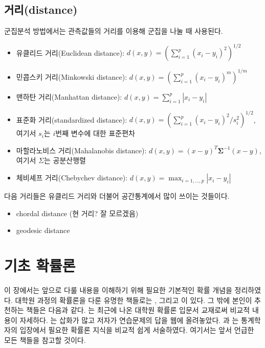 \documentclass[b5paper,]{scrbook}
\theoremstyle{plain}
\theoremstyle{definition}
\numberwithin{equation}{section}
\begin{document}
\section{거리(distance)}\label{distance}

군집분석 방법에서는 관측값들의 거리를 이용해 군집을 나눌 때 사용된다.

\begin{itemize}
\item
  유클리드 거리(Euclidean distance):
  \(d(x,y)=(\sum_{i=1}^{p}(x_{i}-y_{i})^{2})^{1/2}\)
\item
  민콥스키 거리(Minkowski distance):
  \(d(x,y)=(\sum_{i=1}^{p}(x_{i}-y_{i})^{m})^{1/m}\)
\item
  맨하탄 거리(Manhattan distance):
  \(d(x,y)=\sum_{i=1}^{p}|x_{i}-y_{i}|\)
\item
  표준화 거리(standardized distance):
  \(d(x,y)=(\sum_{i=1}^{p}(x_{i}-y_{i})^{2}/s_{i}^{2})^{1/2}\), 여기서
  \(s_{i}\)는 \(i\)번째 변수에 대한 표준편차
\item
  마할라노비스 거리(Mahalanobis distance):
  \(d(x,y)=(x-y)^{T}\boldsymbol{\Sigma}^{-1}(x-y)\), 여기서 \(\Sigma\)는
  공분산행렬
\item
  체비셰프 거리(Chebychev distance):
  \(d(x,y)=\max_{i=1,\ldots ,p}|x_{i}-y_{i}|\)
\end{itemize}

다음 거리들은 유클리드 거리와 더불어 공간통계에서 많이 쓰이는 것들이다.

\begin{itemize}
\item
  chordal distance (현 거리? 잘 모르겠음)
\item
  geodesic distance
\end{itemize}

\chapter{기초 확률론}\label{basicprob}

이 장에서는 앞으로 다룰 내용을 이해하기 위해 필요한 기본적인 확률 개념을
정리하였다. 대학원 과정의 확률론을 다룬 유명한 책들로는
\citep{Durrett2010}, \citep{Billingsley2012} 그리고 \citep{Chung2001}이
있다. 그 밖에 본인이 추천하는 책들은 다음과 같다. \citep{Gut2012}는
최근에 나온 대학원 확률론 입문서 교재로써 비교적 내용이 자세하다.
\citep{Schilling2005}는 삽화가 많고 저자가 연습문제의 답을 웹에
올려놓았다. \citep{Shorack2006}과 \citep{Proschan2016}는 통계학자의
입장에서 필요한 확률론 지식을 비교적 쉽게 서술하였다. 여기서는 앞서
언급한 모든 책들을 참고할 것이다.
\end{document}
